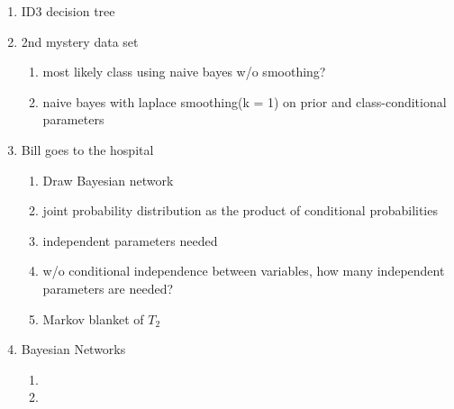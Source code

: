 \begin{enumerate}
	\item
	ID3 decision tree
	
	\item
	2nd mystery data set
	\begin{enumerate}
		\item
		most likely class using naive bayes w/o smoothing?
		
		\item
		naive bayes with laplace smoothing(k = 1) on prior and class-conditional parameters
		
	\end{enumerate}
		
	\item
	Bill goes to the hospital
	\begin{enumerate}
		\item
		Draw Bayesian network
		
		\item
		joint probability distribution as the product of conditional probabilities
		
		\item
		independent parameters needed
		
		\item
		w/o conditional independence between variables, how many independent parameters are needed?
		
		\item
		Markov blanket of $T_2$
	\end{enumerate}
	\item
	Bayesian Networks
	\begin{enumerate}
		\item
		
		\item
		
	\end{enumerate}
		
\end{enumerate}


